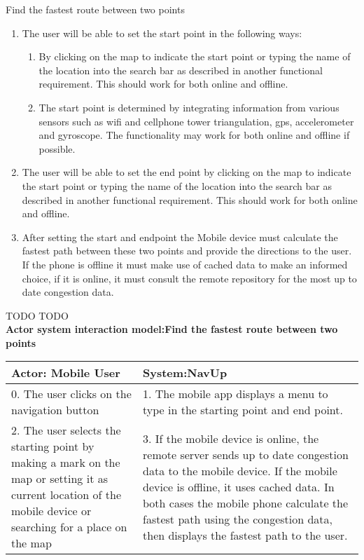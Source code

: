 \FuncReq
{Find the fastest route between two points}%
{
  \begin{enumerate}
    \item The user will be able to set the start point in the following ways:
      \begin{enumerate}
        \item By clicking on the map to indicate the start point or typing the name of the location into the search bar as described in another functional requirement. This should work for both online and offline.
        \item The start point is determined by integrating information from various sensors such as wifi and cellphone tower triangulation, gps, accelerometer and gyroscope. The functionality may work for both online and offline if possible.
      \end{enumerate}

    \item The user will be able to set the end point by clicking on the map to indicate the start point or typing the name of the location into the search bar as described in another functional requirement. This should work for both online and offline.
    \item After setting the start and endpoint the Mobile device must calculate the fastest path between these two points and provide the directions to the user. If the phone is offline it must make use of cached data to make an informed choice, if it is online, it must consult the remote repository for the most up to date congestion data.
  \end{enumerate}
  \mbox{}%
}
{TODO}
{TODO}
    \\
    \textbf{Actor system interaction model:Find the fastest route between two points }\\
    \begin{tabular}{ | p{6cm} | p{6cm} |}
    \hline
    Actor: Mobile User & System:NavUp \\ \hline
    0. The user clicks on the navigation button & 1. The mobile app displays a menu to type in the starting point and end point.\\ \hline
    2. The user selects the starting point by making a mark on the map or setting it as current location of the mobile device or searching for a place on the map & 3. If the mobile device is online, the remote server sends up to date congestion data to the mobile device. If the mobile device is offline, it uses cached data. In both cases the mobile phone calculate the fastest path using the congestion data, then displays the fastest path to the user.\\ \hline
    \end{tabular}
\\
\bigskip

